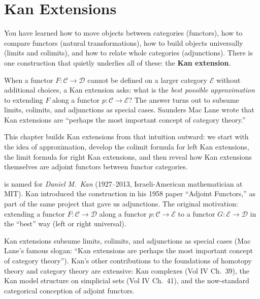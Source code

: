 
\chapter{Kan Extensions}

\begin{overviewbox}
You have learned how to move objects between categories (functors), how to compare
functors (natural transformations), how to build objects universally (limits and
colimits), and how to relate whole categories (adjunctions). There is one
construction that quietly underlies all of these: the \textbf{Kan extension}.

When a functor $F : \mathcal{C} \to \mathcal{D}$ cannot be defined on a larger
category $\mathcal{E}$ without additional choices, a Kan extension asks: what is
the \emph{best possible approximation} to extending $F$ along a functor
$p : \mathcal{C} \to \mathcal{E}$? The answer turns out to subsume limits,
colimits, and adjunctions as special cases. Saunders Mac Lane wrote that Kan
extensions are ``perhaps the most important concept of category theory.''

This chapter builds Kan extensions from that intuition outward: we start with
the idea of approximation, develop the colimit formula for left Kan extensions,
the limit formula for right Kan extensions, and then reveal how Kan extensions
themselves are adjoint functors between functor categories.
\end{overviewbox}

\begin{nameorigin}
 is named for \emph{Daniel M.\ Kan} (1927--2013,
Israeli-American mathematician at MIT). Kan introduced the construction
in his 1958 paper ``Adjoint Functors,'' as part of the same project that
gave us adjunctions. The original motivation: extending a functor
$F : \mathcal{C} \to \mathcal{D}$ along a functor $p : \mathcal{C} \to
\mathcal{E}$ to a functor $G : \mathcal{E} \to \mathcal{D}$ in the
``best'' way (left or right universal).

Kan extensions subsume limits, colimits, and adjunctions as special
cases (Mac Lane's famous slogan: ``Kan extensions are perhaps the most
important concept of category theory''). Kan's other contributions to
the foundations of homotopy theory and category theory are extensive:
Kan complexes (Vol IV Ch.~39), the Kan model structure on simplicial
sets (Vol IV Ch.~41), and the now-standard categorical conception of
adjoint functors.
\end{nameorigin}

